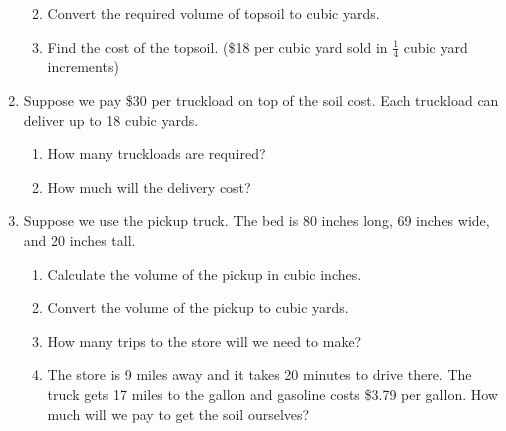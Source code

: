 \begin{exercise}
\begin{enumerate}
\begin{enumerate}

    \item Convert the required volume of topsoil to cubic yards.


    \item Find the cost of the topsoil. (\$18 per cubic yard sold in
      \(\tfrac{1}{4}\) cubic yard increments)

    \end{enumerate}

  \item Suppose we pay \$30 per truckload on top of the soil cost.
    Each truckload can deliver up to 18 cubic yards.
    \begin{enumerate}
    \item How many truckloads are required?


    \item How much will the delivery cost?


    \end{enumerate}

    \newpage

  \item Suppose we use the pickup truck. The bed is 80 inches long, 69
    inches wide, and 20 inches tall.
    \begin{enumerate}
    \item Calculate the volume of the pickup in cubic inches.


    \item Convert the volume of the pickup to cubic yards.


    \item How many trips to the store will we need to make?


    \item The store is 9 miles away and it takes 20 minutes to drive
      there. The truck gets 17 miles to the gallon and gasoline costs
      \$3.79 per gallon. How much will we pay to get the soil
      ourselves?


\end{enumerate}
\end{enumerate}
\end{exercise}
